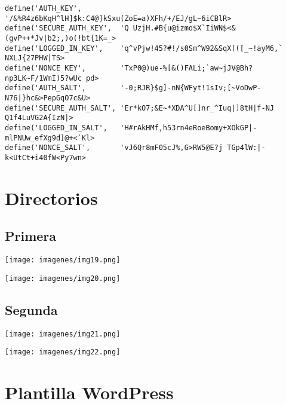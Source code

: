 \documentclass{article}
\begin{document}
\begin{lstlisting}[frame=single] 
define('AUTH_KEY',         '/&%R4z6bKqH^lH]$k:C4@]kSxu(ZoE=a)XFh/+/EJ/gL~6iCBlR>
define('SECURE_AUTH_KEY',  'Q UzjH.#B{u@izmo$X`IiWN$<&(gvP++*Jv|b2;,)o(!bt{1K=_>
define('LOGGED_IN_KEY',    'q^vPjw!45?#!/s0Sm^W92&SqX(([_~!ayM6,` NXLJ{27PHW|TS>
define('NONCE_KEY',        'TxP0@)ue-%[&()FALi;`aw~jJV@Bh?np3LK~F/1WmI)5?wUc pd>
define('AUTH_SALT',        '-0;RJR}$g]-nN{WFyt!1sIv;[~VoDwP-N76|}hc&>PepGqO7c&U>
define('SECURE_AUTH_SALT', 'Er*kO7;&E~*XDA^U[]nr_^Iuq|]8tH|f-NJ Q1f4LuVG2A{IzN|>
define('LOGGED_IN_SALT',   'H#rAkHMf,h53rn4eRoeBomy+XOkGP|-mlPNUw_efXg9d]@+<`Kl>
define('NONCE_SALT',       'vJ6Qr8mF05cJ%,G>RW5@E?j TGp4lW:|-k<UtCt+i40fW<Py7wn>
\end{lstlisting}

\newpage
\section{Directorios}
\subsection{Primera}
\begin{center}
\begin{minipage}{0.5\textwidth} %
    \texttt{[image: imagenes/img19.png]}
\end{minipage}%
\begin{minipage}{0.5\textwidth} %
    \texttt{[image: imagenes/img20.png]}
\end{minipage}
\end{center}


\subsection{Segunda}
\begin{center}
\begin{minipage}{0.5\textwidth} %
    \texttt{[image: imagenes/img21.png]}
\end{minipage}%
\begin{minipage}{0.5\textwidth} %
    \texttt{[image: imagenes/img22.png]}
\end{minipage}
\end{center}




\newpage
\section{Plantilla WordPress}
\end{document}
